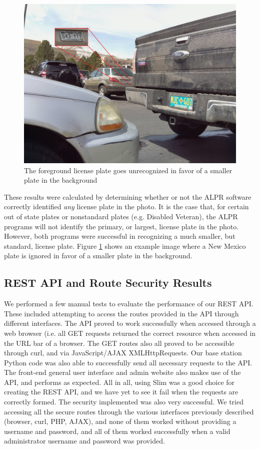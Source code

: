 \documentclass[11pt, oneside, fullpage, doublespace]{article}
\begin{document}
\begin{figure}
\begin{center}
\includegraphics[width=4.5in]{unexpectedrecognition}
\end{center}
\caption{The foreground license plate goes unrecognized in favor of a smaller plate in the background}
\label{fig:unexpectedrecognition}
\end{figure}

These results were calculated by determining whether or not the ALPR software correctly identified \emph{any} license plate in the photo. It is the case that, for certain out of state plates or nonstandard plates (e.g. Disabled Veteran), the ALPR programs will not identify the primary, or largest, license plate in the photo. However, both programs were successful in recognizing a much smaller, but standard, license plate. Figure \ref{fig:unexpectedrecognition} shows an example image where a New Mexico plate is ignored in favor of a smaller plate in the background.

\subsection{REST API and Route Security Results}
We performed a few manual tests to evaluate the performance of our REST API. These included attempting to access the routes provided in the API through different interfaces. The API proved to work successfully when accessed through a web browser (i.e. all GET requests returned the correct resource when accessed in the URL bar of a browser. The GET routes also all proved to be accessible through curl, and via JavaScript/AJAX XMLHttpRequests. Our base station Python code was also able to successfully send all necessary requests to the API. The front-end general user interface and admin website also makes use of the API, and performs as expected. All in all, using Slim was a good choice for creating the REST API, and we have yet to see it fail when the requests are correctly formed. The security implemented was also very successful. We tried accessing all the secure routes through the various interfaces previously described (browser, curl, PHP, AJAX), and none of them worked without providing a username and password, and all of them worked successfully when a valid administrator username and password was provided.
\end{document}
